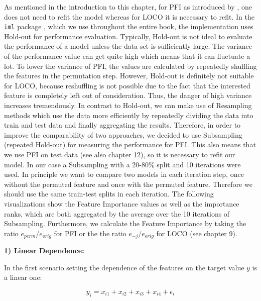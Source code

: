\documentclass[]{krantz}
\begin{document}
As mentioned in the introduction to this chapter, for PFI as introduced
by \citet{breiman2001random}, one does not need to refit the model
whereas for LOCO it is necessary to refit. In the \texttt{iml} package
\citep{molnar2018iml}, which we use throughout the entire book, the
implementation uses Hold-out for performance evaluation. Typically,
Hold-out is not ideal to evaluate the performance of a model unless the
data set is sufficiently large. The variance of the performance value
can get quite high which means that it can fluctuate a lot. To lower the
variance of PFI, the values are calculated by repeatedly shuffling the
features in the permutation step. However, Hold-out is definitely not
suitable for LOCO, because reshuffling is not possible due to the fact
that the interested feature is completely left out of consideration.
Thus, the danger of high variance increases tremendously. In contrast to
Hold-out, we can make use of Resampling methods which use the data more
efficiently by repeatedly dividing the data into train and test data and
finally aggregating the results. Therefore, in order to improve the
comparability of two approaches, we decided to use Subsampling (repeated
Hold-out) for measuring the performance for PFI. This also means that we
use PFI on test data (see also chapter 12), so it is necessary to refit
our model. In our case a Subsampling with a 20-80\% split and 10
iterations were used. In principle we want to compare two models in each
iteration step, once without the permuted feature and once with the
permuted feature. Therefore we should use the same train-test splits in
each iteration. The following visualizations show the Feature Importance
values as well as the importance ranks, which are both aggregated by the
average over the 10 iterations of Subsampling. Furthermore, we calculate
the Feature Importance by taking the ratio \(e_{perm}/e_{orig}\) for PFI
or the the ratio \(e_{-j}/e_{orig}\) for LOCO (see chapter 9).

\textbf{1) Linear Dependence:}

In the first scenario setting the dependence of the features on the
target value \(y\) is a linear one:

\[
y_{i} = x_{i1}+x_{i2}+x_{i3}+x_{i4}+\epsilon_{i}
\]
\end{document}
